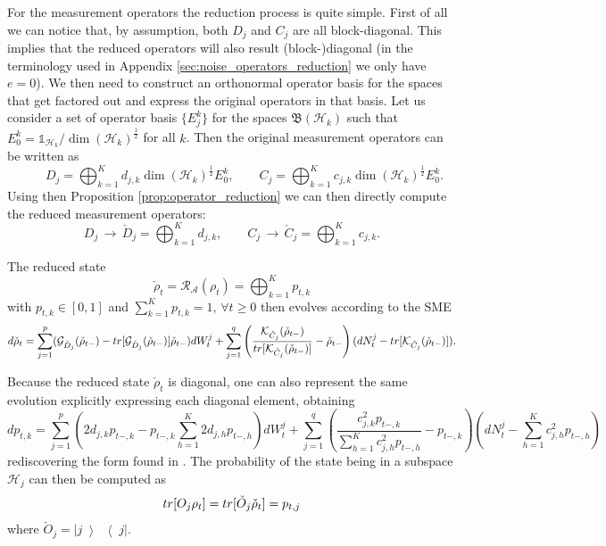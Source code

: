 \documentclass[aihp,12pt]{imsart}
\newcommand{\Gc}{\mathcal{G}}
\newcommand{\Hc}{\mathcal{H}}
\newcommand{\Rc}{\mathcal{R}}
\newcommand{\Kc}{\mathcal{K}}
\newcommand{\As}{\mathscr{A}}
\newcommand{\Bf}{\mathfrak{B}}
\newcommand{\um}{\frac{1}{2}}
\newcommand{\one}{\mathbb{1}}
\newcommand{\tr}{{\rm tr}}
\newcommand{\ketbra}[2]{\left\vert #1 \middle>\middle< #2 \right\vert}
\theoremstyle{theorem}
\theoremstyle{definition}
\theoremstyle{remark}
\begin{document}
For the measurement operators the reduction process is quite simple. First of all we can notice that, by assumption, both $D_j$ and $C_j$ are all block-diagonal. This implies that the reduced operators will also result (block-)diagonal (in the terminology used in Appendix \ref{sec:noise_operators_reduction} we only have $e=0$). We then need to construct an orthonormal operator basis for the spaces that get factored out and express the original operators in that basis. Let us consider a set of operator basis $\{E_j^k\}$ for the spaces $\Bf(\Hc_k)$ such that $E_0^k=\one_{\Hc_k}/\dim(\Hc_k)^\um$ for all $k$. Then the original measurement operators can be written as 
\[ \qquad D_j = \bigoplus_{k=1}^K d_{j,k}\dim(\Hc_k)^\um E_0^k, \qquad C_j = \bigoplus_{k=1}^K c_{j,k}\dim(\Hc_k)^\um E_0^k.\]
Using then Proposition \ref{prop:operator_reduction} we can then directly compute the reduced measurement operators:
\[D_j \,\to\, \check{D}_j = \bigoplus_{k=1}^K d_{j,k},\qquad C_j \,\to\, \check{C}_j = \bigoplus_{k=1}^K c_{j,k} .\]

The reduced state \[\check{\rho}_t = \Rc_\As(\rho_t) = \bigoplus_{k=1}^K p_{t,k}\] with $p_{t,k}\in[0,1]$ and $\sum_{k=1}^K p_{t,k} =1$, $\forall t\geq0$ then evolves according to the SME 
\[d\check{\rho}_t = \sum_{j=1}^p (\Gc_{\check{D}_j}(\check{\rho}_{t-}) - \tr[\Gc_{\check{D}_j}(\check{\rho}_{t-})]\check{\rho}_{t-}) dW_t^j + \sum_{j=1}^q\left(\frac{\Kc_{\check{C}_j}(\check{\rho}_{t-})}{\tr[\Kc_{\check{C}_j}(\check{\rho}_{t-})]}  - \check{\rho}_{t-} \right) (dN_t^j-\tr[\Kc_{\check{C}_j}(\check{\rho}_{t-})]).\]

Because the reduced state $\check{\rho}_t$ is diagonal, one can also represent the same evolution explicitly expressing each diagonal element, obtaining
\[dp_{t,k} = \sum_{j=1}^p \left(2d_{j,k}p_{t-,k}- p_{t-,k} \sum_{h=1}^K 2d_{j,h}p_{t-,h} \right)dW_t^j + \sum_{j=1}^q \left(\frac{c_{j,k}^2 p_{t-,k}}{\sum_{h=1}^K c_{j,h}^2 p_{t-,h}}-p_{t-,k}\right)\left(dN_t^j - \sum_{h=1}^K c_{j,h}^2 p_{t-,h}\right)\]
rediscovering the form found in \cite{Benoist_2014}.
The probability of the state being in a subspace $\Hc_j$ can then be computed as
\[\tr[O_j \rho_t] = \tr[\check{O}_j \check{\rho}_t] = p_{t,j}\]
where $\check{O}_j = \ketbra{j}{j}$. 
\end{document}
